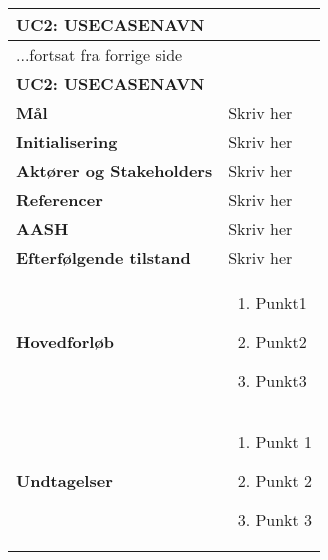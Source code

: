 \begin{center} \centering \label{kravspec:uc2}
	\begin{longtable}{|p{5cm}|p{9cm}|}  %
	\hline
		\multicolumn{2}{|l|}{\textbf{UC2: USECASENAVN}} \\\hline %
		\endfirsthead
		
		\multicolumn{2}{l}{...fortsat fra forrige side} \\ \hline %
		\multicolumn{2}{|l|}{\textbf{UC2: USECASENAVN}} \\\hline %
		\endhead	
		
		\textbf{Mål}							&Skriv her		\\\hline
		\textbf{Initialisering}				&Skriv her		\\\hline
		\textbf{Aktører og Stakeholders}		&Skriv her		\\\hline 
		\textbf{Referencer}					&Skriv her		\\\hline
		\textbf{AASH}						&Skriv her		\\\hline
		\textbf{Efterfølgende tilstand}		&Skriv her		\\\hline
		\textbf{Hovedforløb}					
			&\begin{enumerate}
	
				\item Punkt1
				
				\item Punkt2				
				
				\item Punkt3
				
			\end{enumerate}
		\\\hline
		\textbf{Undtagelser}
			&\begin{enumerate}
			
				\item Punkt 1

				\item Punkt 2
				
				\item Punkt 3

			\end{enumerate}
		\\\hline
	\end{longtable} 
\end{center}

